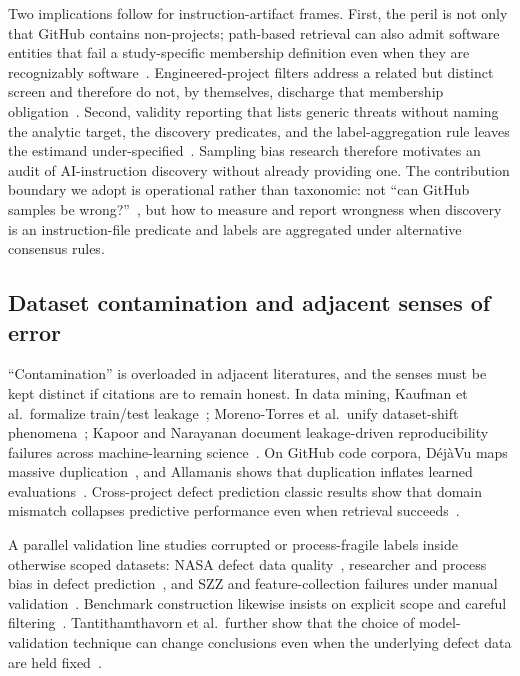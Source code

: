 Two implications follow for instruction-artifact frames.
First, the peril is not only that GitHub contains non-projects; path-based retrieval can also admit software entities that fail a study-specific membership definition even when they are recognizably software~\cite{kalliamvakou2015indepth,baltes2022sampling}.
Engineered-project filters address a related but distinct screen and therefore do not, by themselves, discharge that membership obligation~\cite{munaiah2017curating,phantom2020}.
Second, validity reporting that lists generic threats without naming the analytic target, the discovery predicates, and the label-aggregation rule leaves the estimand under-specified~\cite{verdecchia2023threats,siegmund2015views,baltes2022sampling}.
Sampling bias research therefore motivates an audit of AI-instruction discovery without already providing one.
The contribution boundary we adopt is operational rather than taxonomic: not ``can GitHub samples be wrong?''~\cite{kalliamvakou2015indepth}, but how to measure and report wrongness when discovery is an instruction-file predicate and labels are aggregated under alternative consensus rules.

\subsection{Dataset contamination and adjacent senses of error}
\label{subsec:rw-contamination}

``Contamination'' is overloaded in adjacent literatures, and the senses must be kept distinct if citations are to remain honest.
In data mining, Kaufman et al.\ formalize train/test leakage~\cite{kaufman2012}; Moreno-Torres et al.\ unify dataset-shift phenomena~\cite{moreno2012}; Kapoor and Narayanan document leakage-driven reproducibility failures across machine-learning science~\cite{kapoor2023leakage}.
On GitHub code corpora, D{\'e}j{\`a}Vu maps massive duplication~\cite{lopes2017dejavu}, and Allamanis shows that duplication inflates learned evaluations~\cite{allamanis2019duplication}.
Cross-project defect prediction classic results show that domain mismatch collapses predictive performance even when retrieval succeeds~\cite{zimmermann2008}.

A parallel validation line studies corrupted or process-fragile labels inside otherwise scoped datasets: NASA defect data quality~\cite{shepperd2013nasa}, researcher and process bias in defect prediction~\cite{shepperd2014bias}, and SZZ and feature-collection failures under manual validation~\cite{herbold2022szz}.
Benchmark construction likewise insists on explicit scope and careful filtering~\cite{dambros2012defectbenchmark,tantithamthavorn2017validation}.
Tantithamthavorn et al.\ further show that the choice of model-validation technique can change conclusions even when the underlying defect data are held fixed~\cite{tantithamthavorn2017validation}.

